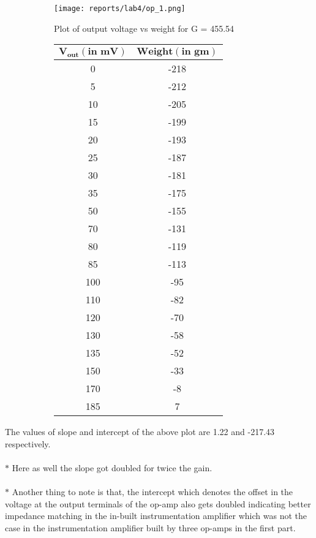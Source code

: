 \documentclass[12pt]{article}
\begin{document}
        \begin{figure}[H]
            \begin{subfigure}{0.7\linewidth}
                \centering
                \texttt{[image: reports/lab4/op\_1.png]}
                \caption{Plot of output voltage vs weight for G = 455.54}
            \end{subfigure} 
            \begin{subfigure}{0.2\linewidth}
                \centering
                \begin{tabular}{|c|c|}
                \hline
                \bfseries $\mathbf{V_{out}(\text{in mV})}$	& \bfseries	$\mathbf{Weight(\text{in gm})}$	\\
                \hline
                    0	&	-218	\\
                    5	&	-212	\\
                    10	&	-205	\\
                    15	&	-199	\\
                    20	&	-193	\\
                    25	&	-187	\\
                    30	&	-181	\\
                    35	&	-175	\\
                    50	&	-155	\\
                    70	&	-131	\\
                    80	&	-119	\\
                    85	&	-113	\\
                    100	&	-95	    \\
                    110	&	-82	    \\
                    120	&	-70	    \\
                    130	&	-58	    \\
                    135	&	-52	    \\
                    150	&	-33	    \\
                    170	&	-8	    \\
                    185	&	7	    \\

                \hline
                \end{tabular}
            \end{subfigure} 
        \end{figure}
        \noindent
        The values of slope and intercept of the above plot are 1.22 and -217.43 respectively.
        \\\\
        $\ast$ Here as well the slope got doubled for twice the gain.\\\\
        $\ast$ Another thing to note is that, the intercept which denotes the offset in the voltage at the output terminals of the op-amp also gets doubled indicating better impedance matching in the in-built instrumentation amplifier which was not the case in the instrumentation amplifier built by three op-amps in the first part.
\end{document}
